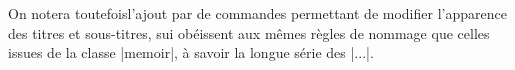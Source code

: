 \begin{noprint}
\renewcommand*{\cftpartpresnum}{\space}
\renewcommand*{\cftpartaftersnum}{.}
\renewcommand*{\cftpartaftersnumb}{\space}
\renewcommand*{\cftpartfont}{\if@modern\sffamily\Large\else\large\fi\scshape\hfil}
\renewcommand*{\cftpartpagefont}{\normalsize}
\setlength{\cftbeforepartskip}{\baselineskip}
\end{noprint}

\begin{developer}
On notera toutefoisl'ajout par \frenchlaw de commandes permettant de modifier l'apparence des titres et sous-titres, sui obéissent aux mêmes règles de nommage que celles issues de la classe |memoir|, à savoir la longue série des |\cft...|.
\end{developer}

\begin{noprint}
\renewcommand{\cftheadingaftersnum}{.}
\renewcommand{\cftheadingaftersnumb}{\upshape\mdseries}
\renewcommand{\cftheadingfont}{\if@modern\sffamily\Large\scshape\else\large\bfseries\fi}
\renewcommand{\cftheadingleader}{\hfill}
\setlength{\cftbeforeheadingskip}{\baselineskip}
\end{noprint}

\begin{noprint}
\renewcommand{\cftsubheadingaftersnum}{.}
\renewcommand{\cftsubheadingaftersnumb}{\upshape\mdseries}
\renewcommand{\cftsubheadingfont}{\if@modern\sffamily\large\scshape\else\normalsize\bfseries\fi}
\renewcommand{\cftsubheadingleader}{\hfill}
\setlength{\cftbeforesubheadingskip}{\baselineskip}
\end{noprint}

\begin{noprint}
\renewcommand*{\cftchapteraftersnum}{.}
\renewcommand*{\cftchapteraftersnumb}{\upshape\mdseries}
\renewcommand{\cftchapterfont}{\if@modern\sffamily\scshape\else\bfseries\fi}
\renewcommand*{\cftchapterpagefont}{\normalsize}
\end{noprint}

